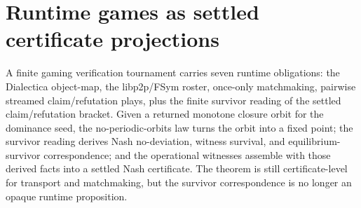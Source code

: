 \section{Runtime games as settled certificate projections}

\begin{theorem}\label{thm:verification-tournament-runtime-certificate}\leanok{}
A finite gaming verification tournament carries seven runtime obligations: the Dialectica
object-map, the libp2p/FSym roster, once-only matchmaking, pairwise streamed claim/refutation
plays, plus the finite survivor reading of the settled claim/refutation bracket. Given a returned
monotone closure orbit for the dominance seed, the no-periodic-orbits law turns the orbit into a
fixed point; the survivor reading derives Nash no-deviation, witness survival, and
equilibrium-survivor correspondence; and the operational witnesses assemble with those derived
facts into a settled Nash certificate. The theorem is still certificate-level for transport and
matchmaking, but the survivor correspondence is no longer an opaque runtime proposition.
\end{theorem}
